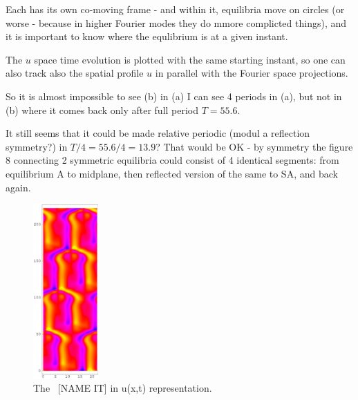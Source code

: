 Each {\rpo} has its own co-moving frame - and within it, equilibria
move on circles (or worse - because in higher Fourier modes they do mmore
complicted things), and it is important to know where the equlibrium is at
a given instant.

The $u$ space time evolution  %
is plotted with the same starting instant,
so one can also track also the spatial profile $u$ in parallel with
the Fourier space projections.

So it is almost impossible to see (b) %
in (a) %
I can see 4 periods in (a), %
but not in (b) %
where it comes back only after full period $T=55.6$.

It still seems that it could be made relative periodic (modul a reflection symmetry?)
in $T/4=55.6/4=13.9$? That would be OK - by symmetry the figure 8 connecting
2 symmetric equilibria could consist of 4 identical segments: from
equilibrium A to midplane, then reflected version of the same to SA, and
back again.


\begin{figure}[t] %
\centering
 	\includegraphics[width=2.5cm]{figs/rpo22-55-4-u.eps}
\hspace{0.1in}
\caption{
 The \rpo\ [NAME IT] in u(x,t) representation. 
        }
\label{f:rpoNAMEITu}
\end{figure}


